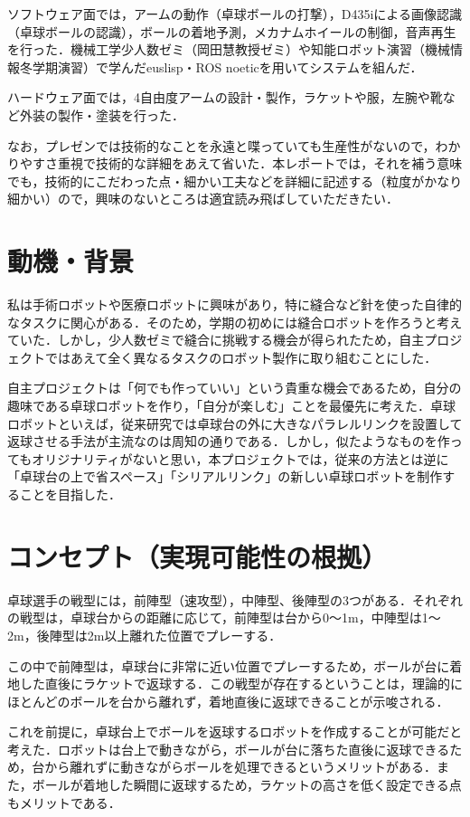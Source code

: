 \documentclass[10pt, oneside, titlepage]{ltjarticle}  %
\begin{document}
ソフトウェア面では，アームの動作（卓球ボールの打撃），D435iによる画像認識（卓球ボールの認識），ボールの着地予測，メカナムホイールの制御，音声再生を行った．機械工学少人数ゼミ（岡田慧教授ゼミ）や知能ロボット演習（機械情報冬学期演習）で学んだeuslisp・ROS noeticを用いてシステムを組んだ．

ハードウェア面では，4自由度アームの設計・製作，ラケットや服，左腕や靴など外装の製作・塗装を行った．

なお，プレゼンでは技術的なことを永遠と喋っていても生産性がないので，わかりやすさ重視で技術的な詳細をあえて省いた．本レポートでは，それを補う意味でも，技術的にこだわった点・細かい工夫などを詳細に記述する（粒度がかなり細かい）ので，興味のないところは適宜読み飛ばしていただきたい．

\section{動機・背景}
私は手術ロボットや医療ロボットに興味があり，特に縫合など針を使った自律的なタスクに関心がある．そのため，学期の初めには縫合ロボットを作ろうと考えていた．しかし，少人数ゼミで縫合に挑戦する機会が得られたため，自主プロジェクトではあえて全く異なるタスクのロボット製作に取り組むことにした．

自主プロジェクトは「何でも作っていい」という貴重な機会であるため，自分の趣味である卓球ロボットを作り，「自分が楽しむ」ことを最優先に考えた．卓球ロボットといえば，従来研究では卓球台の外に大きなパラレルリンクを設置して返球させる手法が主流なのは周知の通りである\cite{omron}．しかし，似たようなものを作ってもオリジナリティがないと思い，本プロジェクトでは，従来の方法とは逆に「卓球台の上で省スペース」「シリアルリンク」の新しい卓球ロボットを制作することを目指した．

\section{コンセプト（実現可能性の根拠）}
卓球選手の戦型には，前陣型（速攻型），中陣型、後陣型の3つがある．それぞれの戦型は，卓球台からの距離に応じて，前陣型は台から0〜1m，中陣型は1〜2m，後陣型は2m以上離れた位置でプレーする．

この中で前陣型は，卓球台に非常に近い位置でプレーするため，ボールが台に着地した直後にラケットで返球する．この戦型が存在するということは，理論的にほとんどのボールを台から離れず，着地直後に返球できることが示唆される．

これを前提に，卓球台上でボールを返球するロボットを作成することが可能だと考えた．ロボットは台上で動きながら，ボールが台に落ちた直後に返球できるため，台から離れずに動きながらボールを処理できるというメリットがある．また，ボールが着地した瞬間に返球するため，ラケットの高さを低く設定できる点もメリットである．
\end{document}
